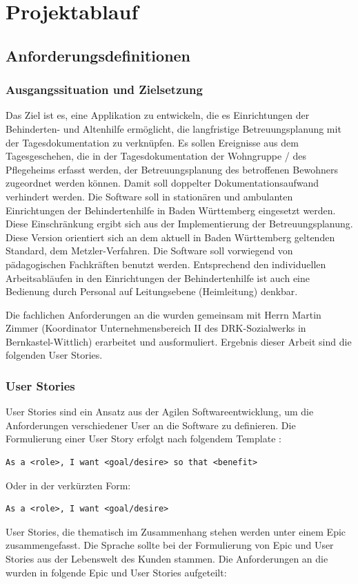 \section{Projektablauf}

\subsection{Anforderungsdefinitionen}

\subsubsection{Ausgangssituation und Zielsetzung}
\label{subsubsec:ziel}
Das Ziel ist es, eine Applikation zu entwickeln, die es Einrichtungen der Behinderten- und Altenhilfe ermöglicht,
die langfristige Betreuungsplanung mit der Tagesdokumentation zu verknüpfen. Es sollen Ereignisse aus dem Tagesgeschehen,
die in der Tagesdokumentation der Wohngruppe / des Pflegeheims erfasst werden,
der Betreuungsplanung des betroffenen Bewohners zugeordnet werden können.
Damit soll doppelter Dokumentationsaufwand verhindert werden.
Die Software soll in stationären und ambulanten Einrichtungen der Behindertenhilfe in Baden Württemberg eingesetzt werden. 
Diese Einschränkung ergibt sich aus der Implementierung der Betreuungsplanung. Diese Version orientiert sich an dem aktuell in Baden Württemberg
geltenden 
Standard, dem Metzler-Verfahren. 
Die Software soll vorwiegend von pädagogischen Fachkräften benutzt werden. Entsprechend den individuellen Arbeitsabläufen in den 
Einrichtungen der Behindertenhilfe ist auch eine Bedienung durch Personal auf Leitungsebene (Heimleitung) denkbar\cite{Pflichtenheft}.

Die fachlichen Anforderungen an die \EBP wurden gemeinsam mit Herrn Martin Zimmer (Koordinator Unternehmensbereich II des DRK-Sozialwerks in
Bernkastel-Wittlich) erarbeitet und ausformuliert. Ergebnis dieser Arbeit sind die folgenden User Stories.

\subsubsection{User Stories}
\label{subsubsec:userstories}
User Stories sind ein Ansatz aus der Agilen Softwareentwicklung, um die Anforderungen verschiedener User an die Software zu definieren. Die
Formulierung einer User Story erfolgt nach folgendem Template \cite{Wikipedia_User_Story}:
\begin{lstlisting}
As a <role>, I want <goal/desire> so that <benefit>
\end{lstlisting}
Oder in der verkürzten Form:
\begin{lstlisting}
As a <role>, I want <goal/desire>
\end{lstlisting}
User Stories, die thematisch im Zusammenhang stehen werden unter einem Epic zusammengefasst. Die Sprache sollte bei der Formulierung
 von Epic und User Stories aus der Lebenswelt des Kunden stammen. Die Anforderungen an die \EBP wurden in folgende Epic und User Stories aufgeteilt:
\newline

